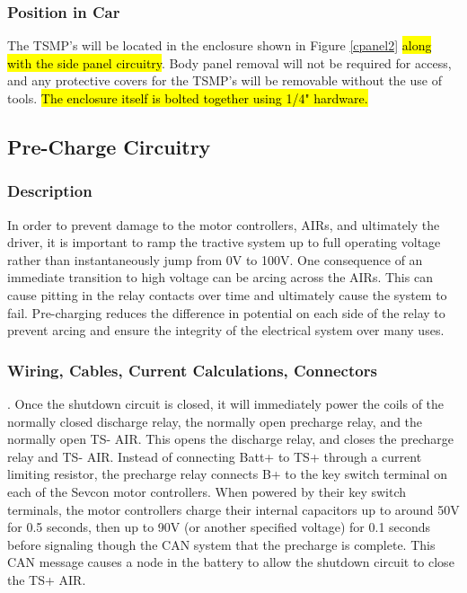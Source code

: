 \documentclass{article}
\DeclareRobustCommand{\hlr}[1]{{\sethlcolor{red}\hl{#1}}}
\begin{document}

        \subsubsection{Position in Car}

            The TSMP's will be located in the enclosure shown in Figure \ref{cpanel2} \hlr{along with the side panel circuitry}. Body panel removal will not be required for access, and any protective covers for the TSMP's will be removable without the use of tools. \hlr{The enclosure itself is bolted together using 1/4" hardware.} %

    \subsection{Pre-Charge Circuitry}

        \subsubsection{Description}

            In order to prevent damage to the motor controllers, AIRs, and ultimately the driver, it is important to ramp the tractive system up to full operating voltage rather than instantaneously jump from 0V to 100V. One consequence of an immediate transition to high voltage can be arcing across the AIRs. This can cause pitting in the relay contacts over time and ultimately cause the system to fail. Pre-charging reduces the difference in potential on each side of the relay to prevent arcing and ensure the integrity of the electrical system over many uses.

        \subsubsection{Wiring, Cables, Current Calculations, Connectors}
.
            Once the shutdown circuit is closed, it will immediately power the coils of the normally closed discharge relay, the normally open precharge relay, and the normally open TS- AIR. This opens the discharge relay, and closes the precharge relay and TS- AIR. Instead of connecting Batt+ to TS+ through a current limiting resistor, the precharge relay connects B+ to the key switch terminal on each of the Sevcon motor controllers. When powered by their key switch terminals, the motor controllers charge their internal capacitors up to around 50V for 0.5 seconds, then up to 90V (or another specified voltage) for 0.1 seconds before signaling though the CAN system that the precharge is complete. This CAN message causes a node in the battery to allow the shutdown circuit to close the TS+ AIR.
\end{document}
